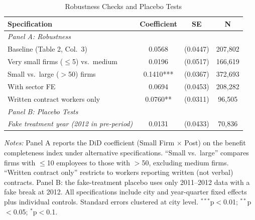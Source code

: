 \begin{table}[htbp]
\centering
\caption{Robustness Checks and Placebo Tests}
\label{tab:robustness}
\begin{tabular}{lccc}
\toprule
Specification & Coefficient & SE & N \\
\midrule
\multicolumn{4}{l}{\textit{Panel A: Robustness}} \\[3pt]
Baseline (Table 2, Col.~3) & 0.0568 & (0.0447) & 207,802 \\
Very small firms ($\leq$5) vs.~medium & 0.0196 & (0.0517) & 166,619 \\
Small vs.~large ($>$50) firms & 0.1410*** & (0.0367) & 372,693 \\
With sector FE & 0.0694 & (0.0453) & 208,282 \\
Written contract workers only & 0.0760** & (0.0311) & 96,505 \\
\midrule
\multicolumn{4}{l}{\textit{Panel B: Placebo Tests}} \\[3pt]
\textit{Fake treatment year (2012 in pre-period)} & 0.0131 & (0.0433) & 70,836 \\
\bottomrule
\end{tabular}
\begin{tablenotes}
\item \textit{Notes:} Panel A reports the DiD coefficient (Small Firm $\times$ Post) on the benefit completeness index under alternative specifications. ``Small vs.~large'' compares firms with $\leq$10 employees to those with $>$50, excluding medium firms. ``Written contract only'' restricts to workers reporting written (not verbal) contracts. Panel B: the fake-treatment placebo uses only 2011--2012 data with a fake break at 2012. All specifications include city and year-quarter fixed effects plus individual controls. Standard errors clustered at city level. $^{***}$p$<$0.01; $^{**}$p$<$0.05; $^{*}$p$<$0.1.
\end{tablenotes}
\end{table}
